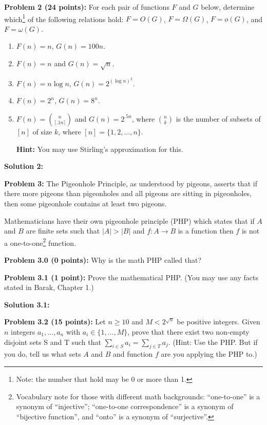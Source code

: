 \documentclass[11pt]{article}
\newcommand{\binom}[2]{{#1 \choose #2}}
\begin{document}
\textbf{Problem 2 (24 points):}
For each pair of functions  $F$ and $G$ below, determine
which\footnote{Note: the number that hold may be 0 or more than 1.} of the following relations hold: $F = O(G)$, $F = \Omega(G)$,
$F = o(G)$, and $F = \omega(G)$.
\begin{enumerate}
	\item $F(n) = n$, $G(n) = 100n$.
	\item $F(n) = n$ and $G(n) = \sqrt{n}$.
	\item $F(n) = n \log n$, $G(n) = 2^{(\log n)^2}$.
    \item $F(n) = 2^n$, $G(n) = 8^n$.
    \item $F(n) = \binom{n}{\lceil .1 n \rceil}$ and $G(n) = 2^{.5 n}$, where $\binom{n}k$ is the number of subsets of $[n]$ of size $k$, where $[n] = \{1, 2, \ldots, n\}$.

{\bf Hint:} You may use Stirling's approximation for this.
\end{enumerate}

\textbf{Solution 2:} %


\textbf{Problem 3:} The Pigeonhole Principle, as understood by pigeons, asserts that if there more pigeons than pigeonholes and all pigeons are sitting in pigeonholes, then some pigeonhole contains at least two pigeons.

Mathematicians have their own pigeonhole principle (PHP) which states that if $A$ and $B$ are finite sets such that $|A| > |B|$ and $f:A\to B$ is a function then $f$ is not a one-to-one\footnote{Vocabulary note for those with different math backgrounds: ``one-to-one'' is a synonym of ``injective''; ``one-to-one correspondence'' is a synonym of ``bijective function'', and ``onto'' is a synonym of ``surjective''.} function.

\textbf{Problem 3.0 (0 points):} Why is the math PHP called that?

\textbf{Problem 3.1 (1 point):} Prove the mathematical PHP. (You may use any facts stated in Barak, Chapter 1.)



\textbf{Solution 3.1:} %

\textbf{Problem 3.2 (15 points):}
Let $n \ge 10$ and $M < 2^{\sqrt{n}}$ be positive integers. Given $n$ integers $a_1,\ldots,  a_n$ with $a_i \in \{1, \ldots, M\}$, prove that there exist two non-empty disjoint sets S and T such that $\sum_{i \in S} a_i = \sum_{j \in T} a_j$. (Hint: Use the PHP. But if you do, tell us what sets $A$ and $B$ and function $f$ are you applying the PHP to.)
\end{document}
